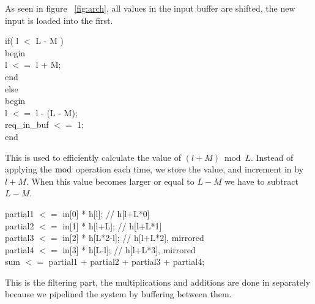 As seen in figure ~\ref{fig:arch}, all values in the input buffer are shifted, the new input is loaded into the first.\\
\begin{center}
\parbox{10cm}{
if( l $<$ L - M )\\
begin\\
\phantom{xxxx} l $<=$ l + M;\\
end\\
else\\
begin\\
\phantom{xxxx}l $<=$ l - (L - M);\\
\phantom{xxxx}req\_in\_buf $<=$ 1;\\
end\\
}
\end{center}
This is used to efficiently calculate the value of $(l + M) \bmod L$. Instead of applying the $\bmod$ operation each time, we store the value, and increment in by $l + M$. When this value becomes larger or equal to  $L - M$ we have to subtract $L - M$.\\
\begin{center}
\parbox{10cm}{
partial1 $<=$ in[0] * h[l];      // h[l+L*0] \\
partial2 $<=$ in[1] * h[l+L];    // h[l+L*1]\\
partial3 $<=$ in[2] * h[L*2-l];  // h[l+L*2], mirrored\\
partial4 $<=$ in[3] * h[L-l];    // h[l+L*3], mirrored\\
sum $<=$ partial1 + partial2 + partial3 + partial4;\\
}
\end{center}
This is the filtering part, the multiplications and additions are done in separately because we pipelined the system by buffering between them.

\centerline{}
